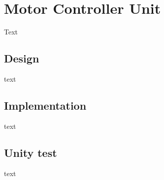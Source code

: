 \section{Motor Controller Unit}
\label{sec:MCU}
Text

\subsection{Design}
text

\subsection{Implementation}
text

\subsection{Unity test}
text